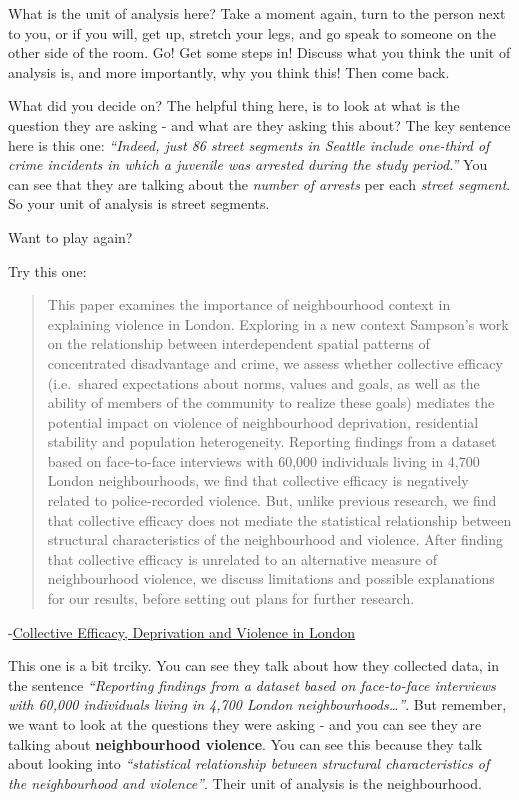 \documentclass[]{book}
\theoremstyle{definition}
\theoremstyle{definition}
\theoremstyle{definition}
\theoremstyle{remark}
\begin{document}
What is the unit of analysis here? Take a moment again, turn to the
person next to you, or if you will, get up, stretch your legs, and go
speak to someone on the other side of the room. Go! Get some steps in!
Discuss what you think the unit of analysis is, and more importantly,
why you think this! Then come back.

What did you decide on? The helpful thing here, is to look at what is
the question they are asking - and what are they asking this about? The
key sentence here is this one: \emph{``Indeed, just 86 street segments
in Seattle include one-third of crime incidents in which a juvenile was
arrested during the study period.''} You can see that they are talking
about the \emph{number of arrests} per each \emph{street segment}. So
your unit of analysis is street segments.

Want to play again?

Try this one:

\begin{quote}
This paper examines the importance of neighbourhood context in
explaining violence in London. Exploring in a new context Sampson's work
on the relationship between interdependent spatial patterns of
concentrated disadvantage and crime, we assess whether collective
efficacy (i.e.~shared expectations about norms, values and goals, as
well as the ability of members of the community to realize these goals)
mediates the potential impact on violence of neighbourhood deprivation,
residential stability and population heterogeneity. Reporting findings
from a dataset based on face-to-face interviews with 60,000 individuals
living in 4,700 London neighbourhoods, we find that collective efficacy
is negatively related to police-recorded violence. But, unlike previous
research, we find that collective efficacy does not mediate the
statistical relationship between structural characteristics of the
neighbourhood and violence. After finding that collective efficacy is
unrelated to an alternative measure of neighbourhood violence, we
discuss limitations and possible explanations for our results, before
setting out plans for further research.
\end{quote}

-\href{https://academic.oup.com/bjc/article-abstract/53/6/1050/418215}{Collective
Efficacy, Deprivation and Violence in London}

This one is a bit trciky. You can see they talk about how they collected
data, in the sentence \emph{``Reporting findings from a dataset based on
face-to-face interviews with 60,000 individuals living in 4,700 London
neighbourhoods\ldots{}''}. But remember, we want to look at the
questions they were asking - and you can see they are talking about
\textbf{neighbourhood violence}. You can see this because they talk
about looking into \emph{``statistical relationship between structural
characteristics of the neighbourhood and violence''}. Their unit of
analysis is the neighbourhood.
\end{document}
